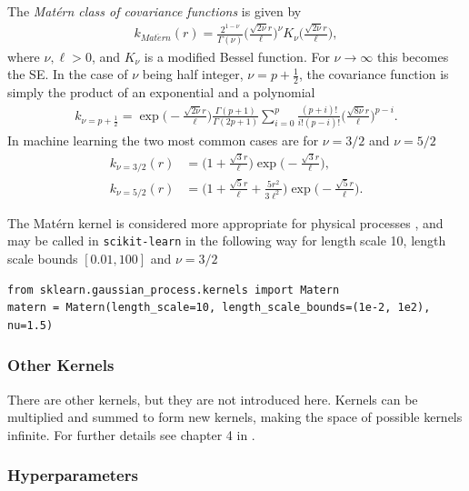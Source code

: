 \documentclass[twoside,english]{uiofysmaster}
\begin{document}
The \textit{Mat\'{e}rn class of covariance functions} is given by
\begin{align}
k_{Mat\acute{e}rn} (r) = \frac{2^{1- \nu}}{\Gamma (\nu)} \Big( \frac{\sqrt{2 \nu} r	}{\ell} \Big)^{\nu} K_{\nu} \Big( \frac{\sqrt{2 \nu}r}{\ell} \Big),
\end{align}
where $\nu, \ell > 0$, and $K_{\nu}$ is a modified Bessel function. For $\nu \rightarrow \infty$ this becomes the SE. In the case of $\nu$ being half integer, $\nu = p + \frac{1}{2}$, the covariance function is simply the product of an exponential and a polynomial
\begin{align}
k_{\nu=p+\frac{1}{2}} = \exp \Big(- \frac{\sqrt{2 \nu} r	}{\ell} \Big) \frac{\Gamma(p+1)}{\Gamma(2p + 1)} \sum^p_{i=0} \frac{(p+i)!}{i!(p-i)!} \Big( \frac{\sqrt{8 \nu} r	}{\ell} \Big)^{p-i}.
\end{align}
In machine learning the two most common cases are for $\nu = 3/2$ and $\nu = 5/2$
\begin{align}
k_{\nu = 3/2}(r) &=  \Big(1 + \frac{\sqrt{3}r}{\ell} \Big) \exp \Big( -\frac{\sqrt{3}r}{\ell} \Big),\\
k_{\nu = 5/2}(r) &=  \Big(1 + \frac{\sqrt{5}r}{\ell}  + \frac{5r^2}{3 \ell^2}\Big) \exp \Big( -\frac{\sqrt{5}r}{\ell} \Big).
\end{align}

The Mat\'{e}rn kernel is considered more appropriate for physical processes \cite{rasmussen2006gaussian}, and may be called in \verb|scikit-learn| in the following way for length scale 10, length scale bounds $[0.01, 100]$ and $\nu = 3/2$
\begin{lstlisting}
from sklearn.gaussian_process.kernels import Matern
matern = Matern(length_scale=10, length_scale_bounds=(1e-2, 1e2), nu=1.5)
\end{lstlisting}

\subsubsection{Other Kernels}

There are other kernels, but they are not introduced here. Kernels can be multiplied and summed to form new kernels, making the space of possible kernels infinite. For further details see chapter 4 in \cite{rasmussen2006gaussian}.





\subsubsection{Hyperparameters}
\end{document}
